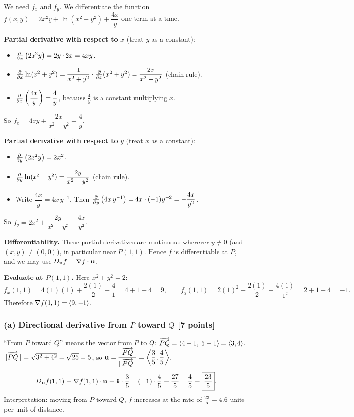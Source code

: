 We need $f_x$ and $f_y$. We differentiate the function
$f(x,y)=2x^2y+\ln(x^2+y^2)+\dfrac{4x}{y}$ one term at a time.

\textbf{Partial derivative with respect to $x$} (treat $y$ as a constant):
\begin{itemize}
\item $\frac{\partial }{\partial x}\left(2x^2y\right)=2y\cdot2x=4xy$.
\item $\frac{\partial }{\partial x}\ln(x^2+y^2)=\dfrac{1}{x^2+y^2}\cdot\frac{\partial }{\partial x}(x^2+y^2)=\dfrac{2x}{x^2+y^2}$ (chain rule).
\item $\frac{\partial }{\partial x}\left(\dfrac{4x}{y}\right)=\dfrac{4}{y}$, because $\frac{4}{y}$ is a constant multiplying $x$.
\end{itemize}
So $f_x=4xy+\dfrac{2x}{x^2+y^2}+\dfrac4y$.

\textbf{Partial derivative with respect to $y$} (treat $x$ as a constant):
\begin{itemize}
\item $\frac{\partial }{\partial y}\left(2x^2y\right)=2x^2$.
\item $\frac{\partial }{\partial y}\ln(x^2+y^2)=\dfrac{2y}{x^2+y^2}$ (chain rule).
\item Write $\dfrac{4x}{y}=4x\,y^{-1}$. Then $\frac{\partial }{\partial y}\left(4x\,y^{-1}\right)=4x\cdot(-1)y^{-2}=-\dfrac{4x}{y^2}$.
\end{itemize}
So $f_y=2x^2+\dfrac{2y}{x^2+y^2}-\dfrac{4x}{y^2}$.

\textbf{Differentiability.} These partial derivatives are continuous wherever
$y\neq0$ (and $(x,y)\neq(0,0)$), in particular near $P(1,1)$. Hence $f$ is
differentiable at $P$, and we may use $D_{\mathbf{u}} f=\nabla f\cdot\mathbf{u}$.

\textbf{Evaluate at $P(1,1)$.} Here $x^2+y^2=2$:
\[
  f_x(1,1)=4(1)(1)+\frac{2(1)}{2}+\frac41=4+1+4=9,\qquad
  f_y(1,1)=2(1)^2+\frac{2(1)}{2}-\frac{4(1)}{1^2}=2+1-4=-1 .
\]
Therefore $\nabla f(1,1)=\left\langle 9,-1 \right\rangle$.

\subsubsection*{(a) Directional derivative from $P$ toward $Q$ [7 points]}

 ``From $P$ toward $Q$'' means the vector from $P$ to $Q$:
$\overrightarrow{PQ}=\left\langle 4-1,\;5-1 \right\rangle=\left\langle 3,4 \right\rangle$.
 $\lVert\overrightarrow{PQ}\rVert=\sqrt{3^2+4^2}=\sqrt{25}=5$, so
$\mathbf{u}=\dfrac{\overrightarrow{PQ}}{\lVert\overrightarrow{PQ}\rVert}=\left\langle \dfrac35,\dfrac45 \right\rangle$.
\[
  D_{\mathbf{u}} f(1,1)=\nabla f(1,1)\cdot\mathbf{u}=9\cdot\frac35+(-1)\cdot\frac45=\frac{27}{5}-\frac45=\boxed{\frac{23}{5}}.
\]
Interpretation: moving from $P$ toward $Q$, $f$ increases at the rate of
$\frac{23}{5}=4.6$ units per unit of distance.

